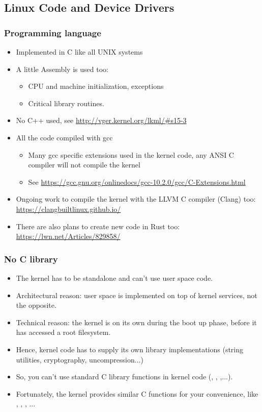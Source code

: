 \subsection{Linux Code and Device Drivers}

\begin{frame}
  \frametitle{Programming language}
  \begin{itemize}
  \item Implemented in C like all UNIX systems
  \item A little Assembly is used too:
    \begin{itemize}
    \item CPU and machine initialization, exceptions
    \item Critical library routines.
    \end{itemize}
  \item No C++ used, see \url{http://vger.kernel.org/lkml/\#s15-3}
  \item All the code compiled with gcc
    \begin{itemize}
    \item Many gcc specific extensions used in the kernel code, any
      ANSI C compiler will not compile the kernel
    \item See
      \url{https://gcc.gnu.org/onlinedocs/gcc-10.2.0/gcc/C-Extensions.html}
    \end{itemize}
    \item Ongoing work to compile the kernel with the LLVM C compiler
      (Clang) too: \url{https://clangbuiltlinux.github.io/}
    \item There are also plans to create new code in Rust too:
      \url{https://lwn.net/Articles/829858/}
  \end{itemize}
\end{frame}

\begin{frame}
  \frametitle{No C library}
  \begin{itemize}
  \item The kernel has to be standalone and can't use user space code.
  \item Architectural reason: user space is implemented on top of kernel services, not the
    opposite.
  \item Technical reason: the kernel is on its own during the boot up
    phase, before it has accessed a root filesystem.
  \item Hence, kernel code has to supply its own library implementations
    (string utilities, cryptography, uncompression...)
  \item So, you can't use standard C library functions in kernel code
    (, , ,...).
  \item Fortunately, the kernel provides similar C functions for your
    convenience, like , ,
    , ...
  \end{itemize}
\end{frame}

